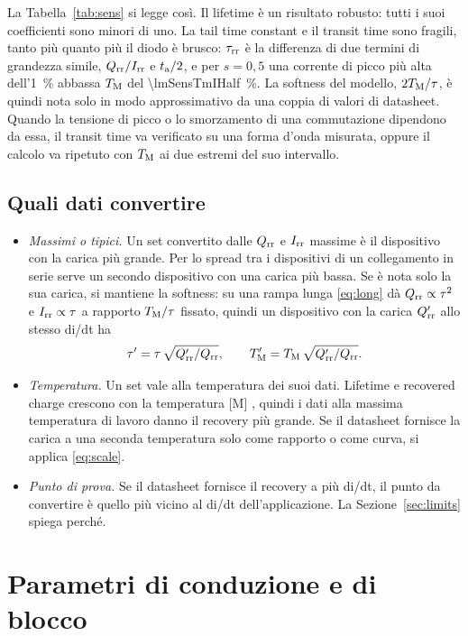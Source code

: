 \documentclass[10pt,a4paper]{scrartcl}
\let\newcommand\lmitdefine
\newcommand{\Irr}{I_\mathrm{rr}}
\newcommand{\Qrr}{Q_\mathrm{rr}}
\newcommand{\ta}{t_\mathrm{a}}
\newcommand{\taurr}{\tau_\mathrm{rr}}
\newcommand{\TM}{T_\mathrm{M}}
\begin{document}
La Tabella~\ref{tab:sens} si legge così. Il lifetime è un risultato robusto: tutti i suoi coefficienti sono minori di uno. La tail time constant e il transit time sono fragili, tanto più quanto più il diodo è brusco: $\taurr$ è la differenza di due termini di grandezza simile, $\Qrr/\Irr$ e $\ta/2$, e per $s = 0,5$ una corrente di picco più alta dell'\SI{1}{\percent} abbassa $\TM$ del \SI{\lmSensTmIHalf}{\percent}. La softness del modello, $2\TM/\tau$, è quindi nota solo in modo approssimativo da una coppia di valori di datasheet. Quando la tensione di picco o lo smorzamento di una commutazione dipendono da essa, il transit time va verificato su una forma d'onda misurata, oppure il calcolo va ripetuto con $\TM$ ai due estremi del suo intervallo.

\subsection{Quali dati convertire}
\label{sec:which}
\begin{itemize}
\item \emph{Massimi o tipici.} Un set convertito dalle $\Qrr$ e $\Irr$ massime è il dispositivo con la carica più grande. Per lo spread tra i dispositivi di un collegamento in serie serve un secondo dispositivo con una carica più bassa. Se è nota solo la sua carica, si mantiene la softness: su una rampa lunga \eqref{eq:long} dà $\Qrr \propto \tau^2$ e $\Irr \propto \tau$ a rapporto $\TM/\tau$ fissato, quindi un dispositivo con la carica $\Qrr'$ allo stesso di/dt ha
\begin{equation}
\tau' = \tau\,\sqrt{\Qrr'/\Qrr} , \qquad \TM' = \TM\,\sqrt{\Qrr'/\Qrr} .
\label{eq:scale}
\end{equation}
\item \emph{Temperatura.} Un set vale alla temperatura dei suoi dati. Lifetime e recovered charge crescono con la temperatura [M] \cite{lutz}, quindi i dati alla massima temperatura di lavoro danno il recovery più grande. Se il datasheet fornisce la carica a una seconda temperatura solo come rapporto o come curva, si applica \eqref{eq:scale}.
\item \emph{Punto di prova.} Se il datasheet fornisce il recovery a più di/dt, il punto da convertire è quello più vicino al di/dt dell'applicazione. La Sezione~\ref{sec:limits} spiega perché.
\end{itemize}

\section{Parametri di conduzione e di blocco}
\label{sec:static}
\end{document}

